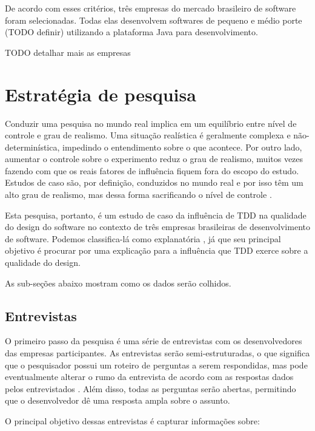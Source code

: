 De acordo com esses critérios, três empresas do mercado brasileiro de software foram selecionadas. 
Todas elas desenvolvem softwares de pequeno e médio porte (TODO definir) utilizando a plataforma Java para desenvolvimento.

TODO detalhar mais as empresas

\section{Estratégia de pesquisa} 
\label{sec:planejamento-estrategia}

Conduzir uma pesquisa no mundo real implica em um equilíbrio entre nível de controle e grau de realismo. 
Uma situação realística é geralmente complexa e não-determinística, impedindo o entendimento sobre o que
acontece. Por outro lado, aumentar o controle sobre o experimento reduz o grau de realismo, muitos
vezes fazendo com que os reais fatores de influência fiquem fora do escopo do estudo. Estudos de caso são,
por definição, conduzidos no mundo real e por isso têm um alto grau de realismo, mas dessa forma sacrificando
o nível de controle \cite{guidelines-case-study}.

Esta pesquisa, portanto, é um estudo de caso da influência de TDD na qualidade do design do software no 
contexto de três empresas brasileiras de desenvolvimento de software. 
Podemos classifica-lá como explanatória \cite{robson}, já que seu principal objetivo é
procurar por uma explicação para a influência que TDD exerce sobre a qualidade do design.

As sub-seções abaixo mostram como os dados serão colhidos.

\subsection{Entrevistas}
\label{sec:planejamento-estrategia-entrevistas}

O primeiro passo da pesquisa é uma série de entrevistas com os desenvolvedores das empresas participantes. 
As entrevistas serão semi-estruturadas, o que significa que o pesquisador possui um roteiro de perguntas a serem respondidas, mas pode eventualmente
alterar o rumo da entrevista de acordo com as respostas dados pelos entrevistados \cite{guidelines-case-study}. 
Além disso, todas as perguntas serão abertas, permitindo que o desenvolvedor dê uma resposta ampla sobre o assunto.

O principal objetivo dessas entrevistas é capturar informações sobre:

